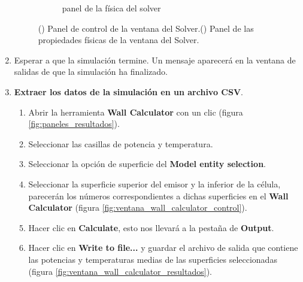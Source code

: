 \begin{enumerate}
\begin{figure}[H]
\begin{subfigure}[b]{0.48\textwidth}
			\caption{panel de la física del solver}
			\label{fig:physics_panel}
		\end{subfigure}
		\caption{() Panel de control de la ventana del Solver.() Panel de las propiedades físicas de la ventana del Solver.}
		\label{fig:panels_Solver}
	\end{figure}
	\item Esperar a que la simulación termine. Un mensaje aparecerá en la ventana de salidas de que la simulación ha finalizado.
	\item \textbf{Extraer los datos de la simulación en un archivo CSV}.
	\begin{enumerate}
		\item Abrir la herramienta \textbf{Wall Calculator} con un clic (figura \ref{fig:paneles_resultados}).
		\item Seleccionar las casillas de potencia y temperatura.
		\item Seleccionar la opción de superficie del \textbf{Model entity selection}.
		\item Seleccionar la superficie superior del emisor y la inferior de la célula, parecerán los números correspondientes a dichas superficies en el \textbf{Wall Calculator} (figura \ref{fig:ventana_wall_calculator_control}).
		\item Hacer clic en \textbf{Calculate}, esto nos llevará a la pestaña de \textbf{Output}.
		\item Hacer clic en \textbf{Write to file...} y guardar el archivo de salida que contiene las potencias y temperaturas medias de las superficies seleccionadas (figura \ref{fig:ventana_wall_calculator_resultados}).
	\end{enumerate}
	\begin{figure}[H]
		\centering
		\begin{subfigure}[b]{0.48\textwidth}
			\centering

\end{subfigure}
\end{figure}
\end{enumerate}
